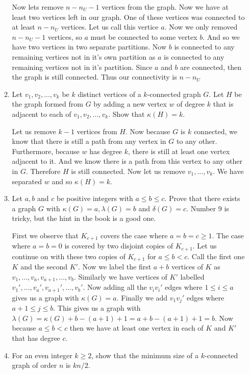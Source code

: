 \documentclass[letterpaper]{article}
\begin{document}
\begin{enumerate}
\begin{enumerate}
  Now lets remove $n-n_{U}-1$ vertices from the graph. Now we have at least two vertices left in our graph. One of these vertices was connected to at least $n-n_{U}$ vertices. Let us call this vertice $a$. Now we only removed $n-n_{U}-1$ vertices, so $a$ must be connected to some vertex $b$. And so we have two vertices in two separate partitions. Now $b$ is connected to any remaining vertices not in it's own partition as $a$ is connected to any remaining vertices not in it's partition. Since $a$ and $b$ are connected, then the graph is still connected. Thus our connectivity is $n-n_{U}$
  \item
  Let $v_1,v_2,\dots,v_k$ be $k$ distinct vertices of a $k$-connected graph $G$. Let $H$ be the graph formed from $G$ by adding a new vertex $w$ of degree $k$ that is adjacent to each of $v_1,v_2,\dots,v_k$. Show that $\kappa(H)=k$.

  Let us remove $k-1$ vertices from $H$. Now because $G$ is $k$ connected, we know that there is still a path from any vertex in $G$ to any other. Furthermore, because $w$ has degree $k$, there is still at least one vertex adjacent to it. And we know there is a path from this vertex to any other in $G$. Therefore $H$ is still connected. Now let us remove $v_1,\dots,v_k$. We have separated $w$ and so $\kappa(H)=k$.
  \setcounter{enumii}{8}
  \item
  Let $a,b$ and $c$ be positive integers with $a\le b\le c$. Prove that there exists a graph $G$ with $\kappa(G)=a, \lambda(G)=b$ and $\delta(G)=c$.
  Number 9 is tricky, but the hint in the book is a good one.

  First we observe that $K_{c+1}$ covers the case where $a=b=c\ge 1$. The case where $a=b=0$ is covered by two disjoint copies of $K_{c+1}$. Let us continue on with these two copies of $K_{c+1}$ for $a\le b<c$. Call the first one $K$ and the second $K'$. Now we label the first $a+b$ vertices of $K$ as $v_1,\dots,v_a,v_{a+1},\dots,v_b$. Similarly we have vertices of $K'$ labelled $v_1',\dots,v_a',v_{a+1}',\dots,v_b'$. Now adding all the $v_iv_i'$ edges where $1\le i\le a$ gives us a graph with $\kappa(G)=a$. Finally we add $v_1v_j'$ edges where $a+1\le j\le b$. This gives us a graph with $\lambda(G)=\kappa(G)+b-(a+1)+1=a+b-(a+1)+1=b$. Now because $a\le b<c$ then we have at least one vertex in each of $K$ and $K'$ that has degree $c$.
  \setcounter{enumii}{12}
  \item
  For an even integer $k\ge 2$, show that the minimum size of a $k$-connected graph of order $n$ is $kn/2$.


\end{enumerate}
\end{enumerate}
\end{document}
